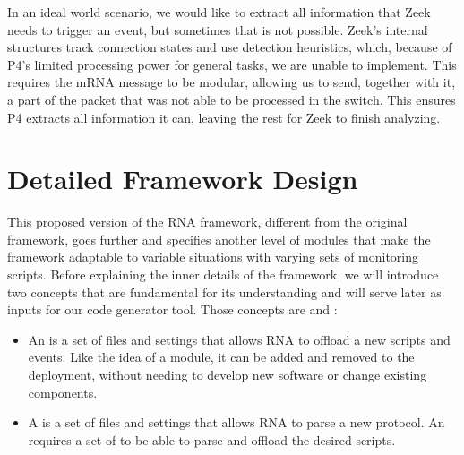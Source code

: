 In an ideal world scenario, we would like to extract all information that Zeek needs to trigger an event, but sometimes that is not possible. Zeek's internal structures track connection states and use detection heuristics, which, because of P4's limited processing power for general tasks, we are unable to implement. This requires the mRNA message to be modular, allowing us to send, together with it, a part of the packet that was not able to be processed in the switch. This ensures P4 extracts all information it can, leaving the rest for Zeek to finish analyzing.

% 
\section{Detailed Framework Design}
\label{sec:rna:detailed_design}

This proposed version of the RNA framework, different from the original framework, goes further and specifies another level of modules that make the framework adaptable to variable situations with varying sets of monitoring scripts. Before explaining the inner details of the framework, we will introduce two concepts that are fundamental for its understanding and will serve later as inputs for our code generator tool. Those concepts are \Offloader{} and \ProtocolTemplate{}:

\begin{itemize}
    \item An \textit{\Offloader{}} is a set of files and settings that allows RNA to offload a new scripts and events. Like the idea of a module, it can be added and removed to the deployment, without needing to develop new software or change existing components.

    \item A \textit{\ProtocolTemplate{}} is a set of files and settings that allows RNA to parse a new protocol. An \Offloader{} requires a set of \ProtocolTemplates{} to be able to parse and offload the desired scripts.
\end{itemize}

